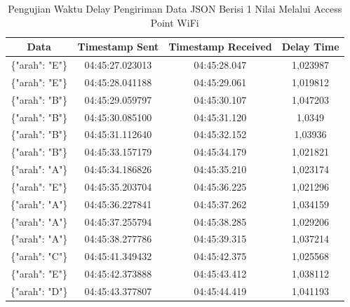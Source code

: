 \begin{longtable}{|ccc|c|}
  \caption{Pengujian Waktu Delay Pengiriman Data JSON Berisi 1 Nilai Melalui Access Point WiFi}
  \label{tbl:delayWiFiJSON1}\\
  \hline
  \multicolumn{1}{|c|}{Data}            & \multicolumn{1}{c|}{Timestamp Sent}  & Timestamp Received & Delay Time  \\ \hline
  \endfirsthead
  \endhead
  \multicolumn{1}{|c|}{\{"arah": "E"\}} & \multicolumn{1}{c|}{04:45:27.023013} & 04:45:28.047       & 1,023987    \\ \hline
  \multicolumn{1}{|c|}{\{"arah": "E"\}} & \multicolumn{1}{c|}{04:45:28.041188} & 04:45:29.061       & 1,019812    \\ \hline
  \multicolumn{1}{|c|}{\{"arah": "B"\}} & \multicolumn{1}{c|}{04:45:29.059797} & 04:45:30.107       & 1,047203    \\ \hline
  \multicolumn{1}{|c|}{\{"arah": "B"\}} & \multicolumn{1}{c|}{04:45:30.085100} & 04:45:31.120       & 1,0349      \\ \hline
  \multicolumn{1}{|c|}{\{"arah": "B"\}} & \multicolumn{1}{c|}{04:45:31.112640} & 04:45:32.152       & 1,03936     \\ \hline
  \multicolumn{1}{|c|}{\{"arah": "B"\}} & \multicolumn{1}{c|}{04:45:33.157179} & 04:45:34.179       & 1,021821    \\ \hline
  \multicolumn{1}{|c|}{\{"arah": "A"\}} & \multicolumn{1}{c|}{04:45:34.186826} & 04:45:35.210       & 1,023174    \\ \hline
  \multicolumn{1}{|c|}{\{"arah": "E"\}} & \multicolumn{1}{c|}{04:45:35.203704} & 04:45:36.225       & 1,021296    \\ \hline
  \multicolumn{1}{|c|}{\{"arah": "A"\}} & \multicolumn{1}{c|}{04:45:36.227841} & 04:45:37.262       & 1,034159    \\ \hline
  \multicolumn{1}{|c|}{\{"arah": "A"\}} & \multicolumn{1}{c|}{04:45:37.255794} & 04:45:38.285       & 1,029206    \\ \hline
  \multicolumn{1}{|c|}{\{"arah": "A"\}} & \multicolumn{1}{c|}{04:45:38.277786} & 04:45:39.315       & 1,037214    \\ \hline
  \multicolumn{1}{|c|}{\{"arah": "C"\}} & \multicolumn{1}{c|}{04:45:41.349432} & 04:45:42.375       & 1,025568    \\ \hline
  \multicolumn{1}{|c|}{\{"arah": "E"\}} & \multicolumn{1}{c|}{04:45:42.373888} & 04:45:43.412       & 1,038112    \\ \hline
  \multicolumn{1}{|c|}{\{"arah": "D"\}} & \multicolumn{1}{c|}{04:45:43.377807} & 04:45:44.419       & 1,041193    \\ \hline

\end{longtable}
